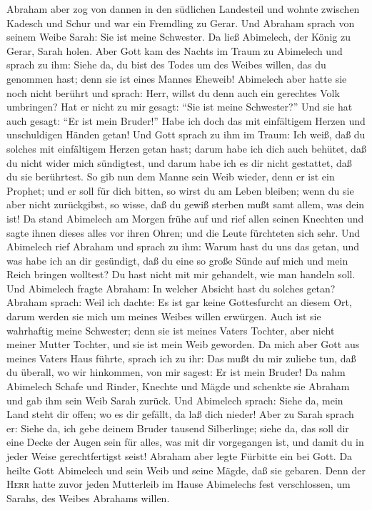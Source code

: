  Abraham aber zog von dannen in den südlichen Landesteil
und wohnte zwischen Kadesch und Schur und war ein Fremdling zu Gerar.
 Und Abraham sprach von seinem Weibe Sarah: Sie ist meine
Schwester. Da ließ Abimelech, der König zu Gerar, Sarah holen.
 Aber Gott kam des Nachts im Traum zu Abimelech und sprach
zu ihm: Siehe da, du bist des Todes um des Weibes willen, das du
genommen hast; denn sie ist eines Mannes Eheweib! 
Abimelech aber hatte sie noch nicht berührt und sprach: Herr, willst du
denn auch ein gerechtes Volk umbringen?  Hat er nicht zu
mir gesagt: ``Sie ist meine Schwester?'' Und sie hat auch gesagt: ``Er
ist mein Bruder!'' Habe ich doch das mit einfältigem Herzen und
unschuldigen Händen getan!  Und Gott sprach zu ihm im
Traum: Ich weiß, daß du solches mit einfältigem Herzen getan hast; darum
habe ich dich auch behütet, daß du nicht wider mich sündigtest, und
darum habe ich es dir nicht gestattet, daß du sie berührtest.
 So gib nun dem Manne sein Weib wieder, denn er ist ein
Prophet; und er soll für dich bitten, so wirst du am Leben bleiben; wenn
du sie aber nicht zurückgibst, so wisse, daß du gewiß sterben mußt samt
allem, was dein ist!  Da stand Abimelech am Morgen frühe
auf und rief allen seinen Knechten und sagte ihnen dieses alles vor
ihren Ohren; und die Leute fürchteten sich sehr.  Und
Abimelech rief Abraham und sprach zu ihm: Warum hast du uns das getan,
und was habe ich an dir gesündigt, daß du eine so große Sünde auf mich
und mein Reich bringen wolltest? Du hast nicht mit mir gehandelt, wie
man handeln soll.  Und Abimelech fragte Abraham: In
welcher Absicht hast du solches getan?  Abraham sprach:
Weil ich dachte: Es ist gar keine Gottesfurcht an diesem Ort, darum
werden sie mich um meines Weibes willen erwürgen.  Auch
ist sie wahrhaftig meine Schwester; denn sie ist meines Vaters Tochter,
aber nicht meiner Mutter Tochter, und sie ist mein Weib geworden.
 Da mich aber Gott aus meines Vaters Haus führte, sprach
ich zu ihr: Das mußt du mir zuliebe tun, daß du überall, wo wir
hinkommen, von mir sagest: Er ist mein Bruder!  Da nahm
Abimelech Schafe und Rinder, Knechte und Mägde und schenkte sie Abraham
und gab ihm sein Weib Sarah zurück.  Und Abimelech
sprach: Siehe da, mein Land steht dir offen; wo es dir gefällt, da laß
dich nieder!  Aber zu Sarah sprach er: Siehe da, ich gebe
deinem Bruder tausend Silberlinge; siehe da, das soll dir eine Decke der
Augen sein für alles, was mit dir vorgegangen ist, und damit du in jeder
Weise gerechtfertigst seist!  Abraham aber legte Fürbitte
ein bei Gott. Da heilte Gott Abimelech und sein Weib und seine Mägde,
daß sie gebaren.  Denn der \textsc{Herr} hatte zuvor
jeden Mutterleib im Hause Abimelechs fest verschlossen, um Sarahs, des
Weibes Abrahams willen.

